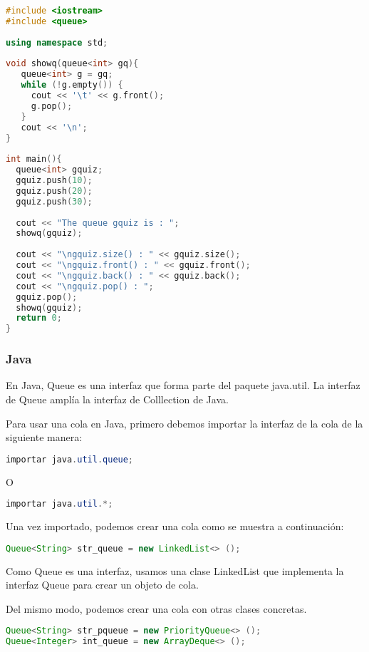 \begin{lstlisting}[language=C++]
#include <iostream>
#include <queue>
	
using namespace std;
	
void showq(queue<int> gq){
   queue<int> g = gq;
   while (!g.empty()) {
     cout << '\t' << g.front();
     g.pop();
   }
   cout << '\n';
}
	
int main(){
  queue<int> gquiz;
  gquiz.push(10);
  gquiz.push(20);
  gquiz.push(30);
		
  cout << "The queue gquiz is : ";
  showq(gquiz);
		
  cout << "\ngquiz.size() : " << gquiz.size();
  cout << "\ngquiz.front() : " << gquiz.front();
  cout << "\ngquiz.back() : " << gquiz.back();
  cout << "\ngquiz.pop() : ";
  gquiz.pop();
  showq(gquiz);
  return 0;
}
\end{lstlisting}

\subsubsection{Java}

En Java, Queue es una interfaz que forma parte del paquete java.util. La interfaz de Queue amplía la interfaz de Colllection de Java.

Para usar una cola en Java, primero debemos importar la interfaz de la cola de la siguiente manera:

\begin{lstlisting}[language=Java]
importar java.util.queue;
\end{lstlisting}

O

\begin{lstlisting}[language=Java]
importar java.util.*;
\end{lstlisting}

Una vez importado, podemos crear una cola como se muestra a continuación:

\begin{lstlisting}[language=Java]
Queue<String> str_queue = new LinkedList<> ();
\end{lstlisting}


Como Queue es una interfaz, usamos una clase LinkedList que implementa la interfaz Queue para crear un objeto de cola.

Del mismo modo, podemos crear una cola con otras clases concretas.

\begin{lstlisting}[language=Java]
Queue<String> str_pqueue = new PriorityQueue<> ();
Queue<Integer> int_queue = new ArrayDeque<> ();
\end{lstlisting}

